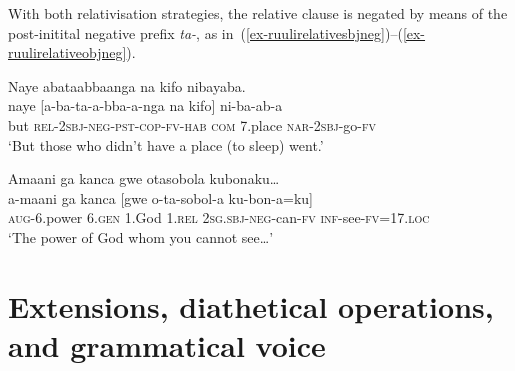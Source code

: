 With both relativisation strategies, the relative clause is negated by means of the post-initital negative prefix \textit{ta-}, as in~(\ref{ex-ruulirelativesbjneg})--(\ref{ex-ruulirelativeobjneg}).

\ea \label{ex-ruulirelative-neg}
\begin{xlist}

\ex\label{ex-ruulirelativesbjneg}
\glll Naye abataabbaanga na kifo nibayaba.\\
	naye [a-ba-ta-a-bba-a-nga na kifo] ni-ba-ab-a\\
		but \textsc{rel}-\textsc{2sbj}-\textsc{neg}-\textsc{pst}-\textsc{cop}-\textsc{fv}-\textsc{hab} \textsc{com} 7.place \textsc{nar}-\textsc{2sbj}-go-\textsc{fv}\\
	\glt ‘But those who didn't have a place (to sleep) went.’

\ex \label{ex-ruulirelativeobjneg}
	\glll Amaani ga kanca gwe otasobola  kubonaku…\\
	a-maani ga kanca [gwe o-ta-sobol-a  ku-bon-a=ku]\\ 
		\textsc{aug}-6.power 6.\textsc{gen} 1.God 1.\textsc{rel} 2\textsc{sg.sbj}-\textsc{neg}-can-\textsc{fv} \textsc{inf}-see-\textsc{fv}=17.\textsc{loc}\\
	\glt `The power of God whom you cannot see…'

\end{xlist}
\z


\section{Extensions, diathetical operations, and grammatical voice}\label{sec-syntax-extensions}

